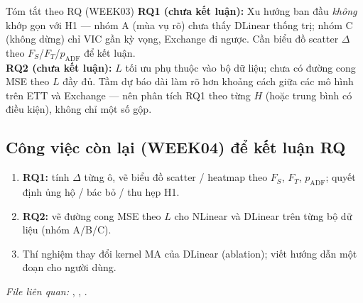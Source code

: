 \begin{examplebox}{Tóm tắt theo RQ (WEEK03)}
  \textbf{RQ1 (chưa kết luận):}
  Xu hướng ban đầu \emph{không} khớp gọn với H1 --- nhóm A (mùa vụ rõ) chưa thấy DLinear thống trị;
  nhóm C (không dừng) chỉ VIC gần kỳ vọng, Exchange đi ngược.
  Cần biểu đồ scatter \(\Delta\) theo \(F_S\)/\(F_T\)/\(p_{\mathrm{ADF}}\) để kết luận.\\[0.35em]
  \textbf{RQ2 (chưa kết luận):}
  \(L\) tối ưu phụ thuộc vào bộ dữ liệu; chưa có đường cong MSE theo \(L\) đầy đủ.
  Tầm dự báo dài làm rõ hơn khoảng cách giữa các mô hình trên ETT và Exchange ---
  nên phân tích RQ1 theo từng \(H\) (hoặc trung bình có điều kiện), không chỉ một số gộp.
\end{examplebox}

\subsection{Công việc còn lại (WEEK04) để kết luận RQ}

\begin{enumerate}
  \item \textbf{RQ1:} tính \(\Delta\) từng ô, vẽ biểu đồ scatter / heatmap theo \(F_S\), \(F_T\),
        \(p_{\mathrm{ADF}}\); quyết định ủng hộ / bác bỏ / thu hẹp H1.
  \item \textbf{RQ2:} vẽ đường cong MSE theo \(L\) cho NLinear và DLinear
        trên từng bộ dữ liệu (nhóm A/B/C).
  \item Thí nghiệm thay đổi kernel MA của DLinear (ablation); viết hướng dẫn một đoạn cho người dùng.
\end{enumerate}

\vspace{0.5em}
\noindent\textit{File liên quan:}
,
,
.
